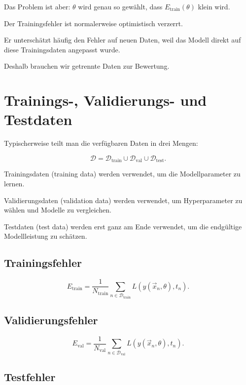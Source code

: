 Das Problem ist aber:
\(\theta\) wird genau so gewählt, dass \(E_{\mathrm{train}}(\theta)\) klein wird.

\begin{conceptbox}
Der Trainingsfehler ist normalerweise optimistisch verzerrt.

Er unterschätzt häufig den Fehler auf neuen Daten, weil das Modell direkt auf diese Trainingsdaten angepasst wurde.
\end{conceptbox}

Deshalb brauchen wir getrennte Daten zur Bewertung.

\section{Trainings-, Validierungs- und Testdaten}

Typischerweise teilt man die verfügbaren Daten in drei Mengen:

\[
    \mathcal{D}
    =
    \mathcal{D}_{\mathrm{train}}
    \cup
    \mathcal{D}_{\mathrm{val}}
    \cup
    \mathcal{D}_{\mathrm{test}}.
\]

\begin{definitionbox}
Trainingsdaten (training data) werden verwendet, um die Modellparameter zu lernen.

Validierungsdaten (validation data) werden verwendet, um Hyperparameter zu wählen und Modelle zu vergleichen.

Testdaten (test data) werden erst ganz am Ende verwendet, um die endgültige Modellleistung zu schätzen.
\end{definitionbox}

\subsection{Trainingsfehler}

\[
    E_{\mathrm{train}}
    =
    \frac{1}{N_{\mathrm{train}}}
    \sum_{n\in\mathcal{D}_{\mathrm{train}}}
    L(y(\vec{x}_n,\theta),t_n).
\]

\subsection{Validierungsfehler}

\[
    E_{\mathrm{val}}
    =
    \frac{1}{N_{\mathrm{val}}}
    \sum_{n\in\mathcal{D}_{\mathrm{val}}}
    L(y(\vec{x}_n,\theta),t_n).
\]

\subsection{Testfehler}

